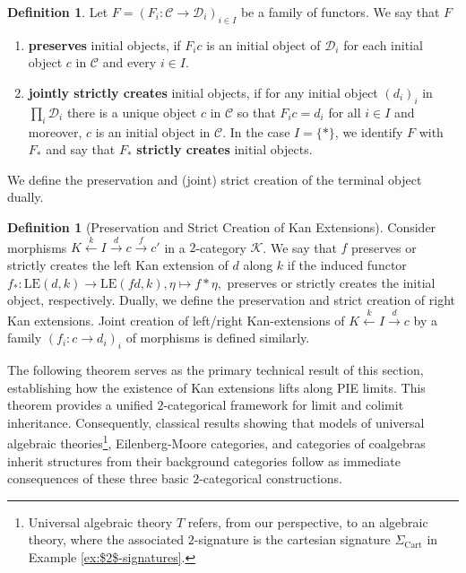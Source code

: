 \documentclass[11pt]{article}
\theoremstyle{plain}
\theoremstyle{definition}
\newtheorem{definition}[theorem]{Definition}
\numberwithin{equation}{section}
\newcommand{\C}{\mathcal{C}}
\newcommand{\D}{\mathcal{D}}
\newcommand{\K}{\mathcal{K}}
\newcommand{\LE}{\mathrm{LE}}
\begin{document}
\begin{definition}
   Let $F = (F_i\colon\C\to \D_i)_{i\in I}$ be a family of functors. We say that $F$
   \begin{enumerate}
       \item \textbf{preserves} initial objects, if $F_ic$ is an initial object of $\D_i$ for each initial object $c$ in $\C$ and every $i\in I$.
       \item \textbf{jointly strictly creates} initial objects, if for any initial object $(d_i)_i$ in $\prod_i \D_i$ there is a unique object $c$ in $\C$ so that $F_ic = d_i$ for all $i\in I$ and moreover, $c$ is an initial object in $\C$. In the case $I = \{*\}$, we identify $F$ with $F_*$ and say that $F_*$ \textbf{strictly creates} initial objects.
   \end{enumerate}
   We define the preservation and (joint) strict creation of the terminal object dually. 
\end{definition}
\begin{definition}[Preservation and Strict Creation of Kan Extensions]
   Consider morphisms $K\xleftarrow{k}I\xrightarrow{d}c\xrightarrow{f}c'$ in a $2$-category $\K$. We say that $f$ preserves or strictly creates the left Kan extension of $d$ along $k$ if the induced functor $f_*\colon \LE(d,k)\to \LE(fd,k), \eta\mapsto f*\eta,$ preserves or strictly creates the initial object, respectively. Dually, we define the preservation and strict creation of right Kan extensions. Joint creation of left/right Kan-extensions of $K\xleftarrow{k}I\xrightarrow{d}c$ by a family $(f_i\colon c\to d_i)_i$ of morphisms is defined similarly.
\end{definition}

The following theorem serves as the primary technical result of this section, establishing how the existence of Kan extensions lifts along PIE limits. This theorem provides a unified $2$-categorical framework for limit and colimit inheritance. Consequently, classical results showing that models of universal algebraic theories\footnote{Universal algebraic theory $T$ refers, from our perspective, to an algebraic theory, where the associated $2$-signature is the cartesian signature $\Sigma_{\text{Cart}}$ in Example \ref{ex:$2$-signatures}.}, Eilenberg-Moore categories, and categories of coalgebras inherit structures from their background categories follow as immediate consequences of these three basic $2$-categorical constructions.
\end{document}

